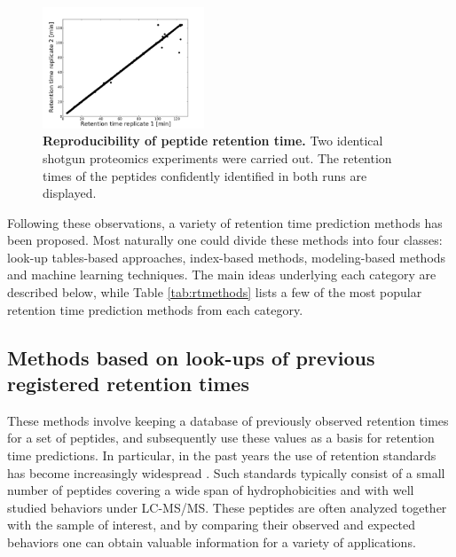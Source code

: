 \documentclass[a4paper]{article}
\begin{document}
\begin{figure}
\vspace{-10pt}
\centering
\includegraphics[trim=0.5cm 0cm 2cm 1.5cm, clip=true, width=0.43\textwidth]{img/reproducibility.pdf}
\caption{\label{fig:repr} {\bf Reproducibility of peptide retention time.} Two identical shotgun proteomics experiments were carried out. The retention times of the peptides confidently identified in both runs are displayed.}
\vspace{-25pt}
\end{figure}

Following these observations, a variety of retention time prediction
methods has been proposed. Most naturally one could divide these
methods into four classes: look-up tables-based approaches,
index-based methods, modeling-based methods and machine learning
techniques. The main ideas underlying each category are described
below, while Table \ref{tab:rtmethods} lists a few of the most popular
retention time prediction methods from each category.

\subsection{Methods based on look-ups of previous registered retention times}

These methods involve keeping a database of previously observed
retention times for a set of peptides, and subsequently use these
values as a basis for retention time predictions. In particular, in
the past years the use of retention standards has become increasingly
widespread \cite{olegstd, irt}. Such standards typically consist of a
small number of peptides covering a wide span of hydrophobicities and
with well studied behaviors under LC-MS/MS. These peptides are often
analyzed together with the sample of interest, and by comparing their
observed and expected behaviors one can obtain valuable information
for a variety of applications.
\end{document}
